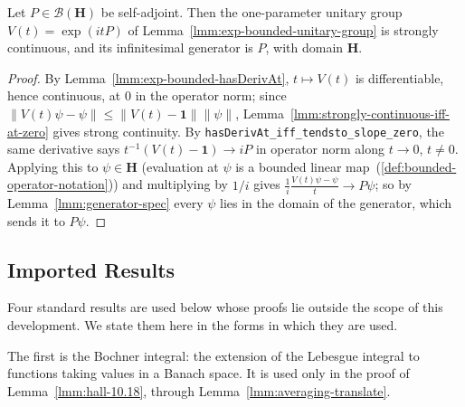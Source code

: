 \begin{lemma}
    \label{lmm:generator-exp-bounded}
    \leanok
    Let $P \in \mathcal{B}(\mathbf{H})$ be self-adjoint. Then the one-parameter unitary group $V(t) = \exp(itP)$ of Lemma~\ref{lmm:exp-bounded-unitary-group} is strongly continuous, and its infinitesimal generator is $P$, with domain $\mathbf{H}$.
\end{lemma}
\begin{proof}
    \leanok
    By Lemma~\ref{lmm:exp-bounded-hasDerivAt}, $t \mapsto V(t)$ is differentiable, hence continuous, at $0$ in the operator norm; since $\left\| V(t)\psi - \psi \right\| \le \left\| V(t) - \mathbf{1} \right\| \left\| \psi \right\|$, Lemma~\ref{lmm:strongly-continuous-iff-at-zero} gives strong continuity. By \texttt{hasDerivAt\_iff\_tendsto\_slope\_zero}, the same derivative says $t^{-1}(V(t) - \mathbf{1}) \to iP$ in operator norm along $t \to 0$, $t \ne 0$. Applying this to $\psi \in \mathbf{H}$ (evaluation at $\psi$ is a bounded linear map~(\ref{def:bounded-operator-notation})) and multiplying by $1/i$ gives $\frac{1}{i}\frac{V(t)\psi - \psi}{t} \to P\psi$; so by Lemma~\ref{lmm:generator-spec} every $\psi$ lies in the domain of the generator, which sends it to $P\psi$.
\end{proof}

\subsection{Imported Results}
Four standard results are used below whose proofs lie outside the scope of this development. We state them here in the forms in which they are used.

The first is the Bochner integral: the extension of the Lebesgue integral to functions taking values in a Banach space. It is used only in the proof of Lemma~\ref{lmm:hall-10.18}, through Lemma~\ref{lmm:averaging-translate}.

